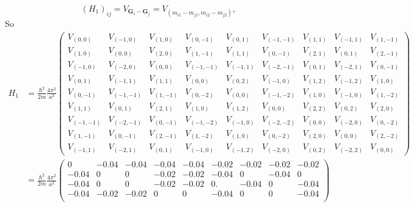 \documentclass[12pt]{article}
\begin{document}
\begin{enumerate}[(a)]
\begin{equation}
	      	(H_1)_{ij} = V_{\bm{G}_i - \bm{G}_j} = V_{(m_{i1} - m_{j1}, m_{i2} - m_{j2})},
	      \end{equation}
	      So
	      \begin{equation}
	      	\begin{split}
	      		H_1 &=  \frac{\hbar^2}{2m}\frac{4\pi^2}{a^2}
	      		\begin{pmatrix}
	      			V_{(0, 0)}   & V_{(-1, 0)}  & V_{(1, 0)}  & V_{(0, -1)}  & V_{(0, 1)}  & V_{(-1, -1)} & V_{(1, 1)} & V_{(-1, 1)} & V_{(1, -1)} \\
	      			V_{(1, 0)}   & V_{(0, 0)}   & V_{(2, 0)}  & V_{(1, -1)}  & V_{(1, 1)}  & V_{(0, -1)}  & V_{(2, 1)} & V_{(0, 1)}  & V_{(2, -1)} \\
	      			V_{(-1, 0)}  & V_{(-2, 0)}  & V_{(0, 0)}  & V_{(-1, -1)} & V_{(-1, 1)} & V_{(-2, -1)} & V_{(0, 1)} & V_{(-2, 1)} & V_{(0, -1)} \\
	      			V_{(0, 1)}   & V_{(-1, 1)}  & V_{(1, 1)}  & V_{(0, 0)}   & V_{(0, 2)}  & V_{(-1, 0)}  & V_{(1, 2)} & V_{(-1, 2)} & V_{(1, 0)}  \\
	      			V_{(0, -1)}  & V_{(-1, -1)} & V_{(1, -1)} & V_{(0, -2)}  & V_{(0, 0)}  & V_{(-1, -2)} & V_{(1, 0)} & V_{(-1, 0)} & V_{(1, -2)} \\
	      			V_{(1, 1)}   & V_{(0, 1)}   & V_{(2, 1)}  & V_{(1, 0)}   & V_{(1, 2)}  & V_{(0, 0 )}  & V_{(2, 2)} & V_{(0, 2)}  & V_{(2, 0)}  \\
	      			V_{(-1, -1)} & V_{(-2, -1)} & V_{(0, -1)} & V_{(-1, -2)} & V_{(-1, 0)} & V_{(-2, -2)} & V_{(0, 0)} & V_{(-2, 0)} & V_{(0, -2)} \\
	      			V_{(1, -1)}  & V_{(0, -1)}  & V_{(2, -1)} & V_{(1, -2)}  & V_{(1, 0)}  & V_{(0, -2)}  & V_{(2, 0)} & V_{(0, 0)}  & V_{(2, -2)} \\
	      			V_{(-1, 1)}  & V_{(-2, 1)}  & V_{(0, 1)}  & V_{(-1, 0)}  & V_{(-1, 2)} & V_{(-2, 0)}  & V_{(0, 2)} & V_{(-2, 2)} & V_{(0, 0)}
	      		\end{pmatrix}\\
	      		&= \frac{\hbar^2}{2m}\frac{4\pi^2}{a^2}
	      		\begin{pmatrix}
	      			0     & -0.04 & -0.04 & -0.04 & -0.04 & -0.02 & -0.02 & -0.02 & -0.02 \\
	      			-0.04 & 0     & 0     & -0.02 & -0.02 & -0.04 & 0     & -0.04 & 0     \\
	      			-0.04 & 0     & 0     & -0.02 & -0.02 & 0.    & -0.04 & 0     & -0.04 \\
	      			-0.04 & -0.02 & -0.02 & 0     & 0     & -0.04 & 0     & 0     & -0.04 \\

\end{pmatrix}
\end{split}
\end{equation}
\end{enumerate}
\end{document}
